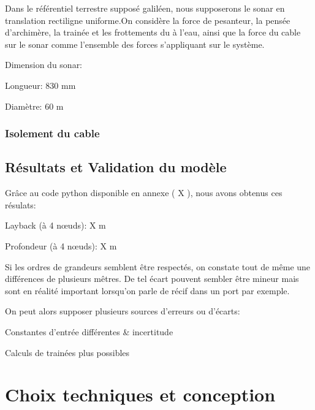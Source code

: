 \documentclass[12pt,a4paper]{article}
\begin{document}
Dans le référentiel terrestre supposé galiléen, nous supposerons le sonar en translation rectiligne uniforme.On considère la force de pesanteur, la pensée d'archimère, la trainée et les frottements du à l'eau, ainsi que la force du cable sur le sonar comme l'ensemble des forces s'appliquant sur le système.


Dimension du sonar:


Longueur: 830 mm


Diamètre: 60 m


\subsubsection{Isolement du cable}


\subsection{Résultats et Validation du modèle}


Grâce au code python disponible en annexe ( X ), nous avons obtenus ces résulats:


Layback (à 4 nœuds): X m


Profondeur (à 4 nœuds): X m


Si les ordres de grandeurs semblent être respectés, on constate tout de même une différences de plusieurs mêtres. De tel écart pouvent sembler être mineur mais sont en réalité important lorsqu'on parle de récif dans un port par exemple.


On peut alors supposer plusieurs sources d'erreurs ou d'écarts:


\item Constantes d'entrée différentes & incertitude


\item Calculs de trainées plus possibles


















\section{Choix techniques et conception}
\end{document}

